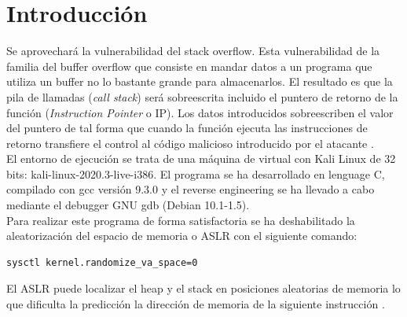 \documentclass[a4paper,oneside]{article}
\begin{document}

\section{Introducción}
Se aprovechará la vulnerabilidad del stack overflow. Esta vulnerabilidad de la familia del buffer overflow que consiste en mandar datos a un programa que utiliza un buffer no lo bastante grande para almacenarlos. El resultado es que la pila de llamadas (\textit{call stack}) será sobreescrita incluido el puntero de retorno de la función (\textit{Instruction Pointer} o IP). Los datos introducidos sobreescriben el valor del puntero de tal forma que cuando la función ejecuta las instrucciones de retorno transfiere el control al código malicioso introducido por el atacante \cite{buffer}.\\

El entorno de ejecución se trata de una máquina de virtual con Kali Linux de 32 bits: kali-linux-2020.3-live-i386. El programa se ha desarrollado en lenguage C, compilado con gcc versión 9.3.0 y el reverse engineering se ha llevado a cabo mediante el debugger GNU gdb (Debian 10.1-1.5).\\

Para realizar este programa de forma satisfactoria se ha deshabilitado la aleatorización del espacio de memoria o ASLR con el siguiente comando:
\begin{lstlisting}[language=bash]
sysctl kernel.randomize_va_space=0
\end{lstlisting}
El ASLR puede localizar el heap y el stack en posiciones aleatorias de memoria lo que dificulta la predicción la dirección de memoria de la siguiente instrucción \cite{aslr}.\\
\end{document}
